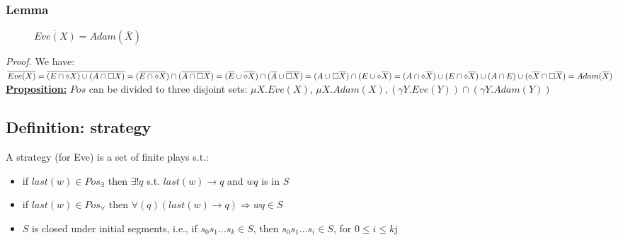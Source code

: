 \subsubsection*{Lemma}
\begin{figure}[H]
	\centering
	$\overline{Eve(X)} = Adam(\overline{X})$
\end{figure}
\textit{Proof.} We have:\\
$\overline{Eve(X)} = \overline{(E \cap \diamond X) \cup (A \cap \square X)}\newline
 = (\overline{E \cap \diamond X}) \cap (\overline{A \cap \square X})\newline
 = (\overline{E} \cup \overline{\diamond X}) \cap (\overline{A} \cup \overline{\square X})\newline
 = (A \cup \square \overline{X}) \cap (E \cup \diamond \overline{X})\newline
 = (A \cap \diamond \overline{X}) \cup (E \cap \diamond \overline{X})
 \cup (A \cap E) \cup (\diamond \overline{X} \cap \square \overline{X}) = Adam(\overline{X})$\\

\noindent
\underline{\textbf{Proposition:}} $Pos$ can be divided to three disjoint sets:
$\mu X. Eve(X)$, $\mu X. Adam(X), (\gamma Y. Eve(Y)) \cap (\gamma Y. Adam(Y))$\\

\subsection*{Definition: strategy}
A strategy (for Eve) is a set of finite plays s.t.:
\begin{itemize}
	\item if $last(w) \in Pos_{\exists}$ then $\exists! q$ s.t. $last(w) \rightarrow q$ and $wq$ is in $S$
	\item if $last(w) \in Pos_{\forall}$ then $\forall(q) (last(w) \rightarrow q) \Rightarrow wq \in S$
	\item $S$ is closed under initial segments, i.e., if $s_0s_1...s_k \in S$, then $s_0s_1...s_i \in S$,
	for $0 \leq i \leq k$j
\end{itemize}
